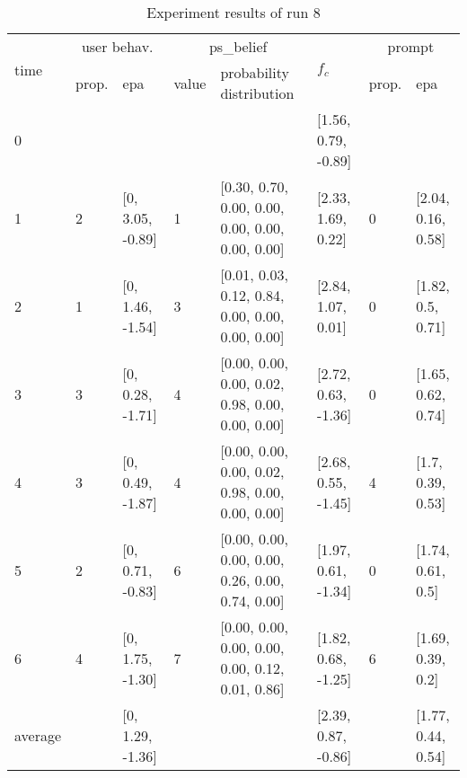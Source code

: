 \begin{table}[htbp]\footnotesize
\caption{Experiment results of run 8}
\begin{tabular}{|p{0.4cm}|p{0.6cm}|l|p{0.6cm}|p{3.3cm}|l|p{0.6cm}|l|}
\hline

\multirow{2}{*}{time} & \multicolumn{2}{c|}{user behav.} & \multicolumn{2}{c|}{ps\_belief} &
\multirow{2}{*}{$f_c$} & \multicolumn{2}{c|}{prompt} \\ \cline{2-5}\cline{ 7- 8}
& prop. & epa & value & probability distribution &  & prop. & epa \\ \hline

0 & \multicolumn{1}{l|}{} &  & \multicolumn{1}{l|}{} &  & [1.56, 0.79, -0.89] & \multicolumn{1}{l|}{} &  \\ \hline
1 & 2 & [0, 3.05, -0.89] & 1 & [0.30, 0.70, 0.00, 0.00, 0.00, 0.00, 0.00, 0.00] & [2.33, 1.69, 0.22] & 0 & [2.04, 0.16, 0.58] \\ \hline
2 & 1 & [0, 1.46, -1.54] & 3 & [0.01, 0.03, 0.12, 0.84, 0.00, 0.00, 0.00, 0.00] & [2.84, 1.07, 0.01] & 0 & [1.82, 0.5, 0.71] \\ \hline
3 & 3 & [0, 0.28, -1.71] & 4 & [0.00, 0.00, 0.00, 0.02, 0.98, 0.00, 0.00, 0.00] & [2.72, 0.63, -1.36] & 0 & [1.65, 0.62, 0.74] \\ \hline
4 & 3 & [0, 0.49, -1.87] & 4 & [0.00, 0.00, 0.00, 0.02, 0.98, 0.00, 0.00, 0.00] & [2.68, 0.55, -1.45] & 4 & [1.7, 0.39, 0.53] \\ \hline
5 & 2 & [0, 0.71, -0.83] & 6 & [0.00, 0.00, 0.00, 0.00, 0.26, 0.00, 0.74, 0.00] & [1.97, 0.61, -1.34] & 0 & [1.74, 0.61, 0.5] \\ \hline
6 & 4 & [0, 1.75, -1.30] & 7 & [0.00, 0.00, 0.00, 0.00, 0.00, 0.12, 0.01, 0.86] & [1.82, 0.68, -1.25] & 6 & [1.69, 0.39, 0.2] \\ \hline
\multicolumn{1}{|l|}{average} & \multicolumn{1}{l|}{} & [0, 1.29, -1.36] & \multicolumn{1}{l|}{} &  & [2.39, 0.87, -0.86] & \multicolumn{1}{l|}{} & [1.77, 0.44, 0.54] \\ \hline
\end{tabular}
\label{}
\end{table}


